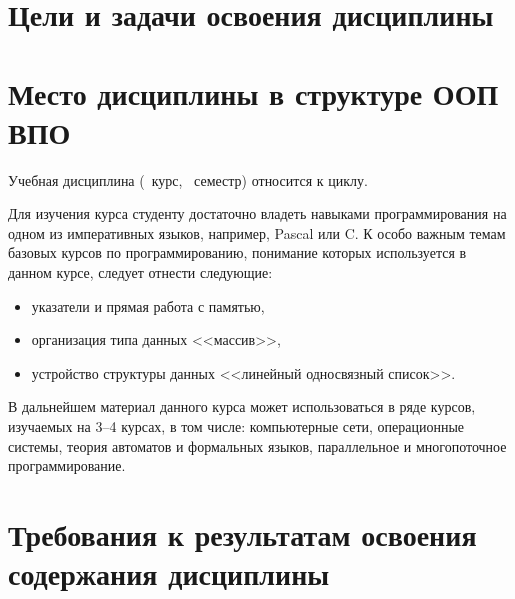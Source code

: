 






\section{Цели и задачи освоения дисциплины}


\section{Место дисциплины в структуре ООП ВПО}


	\ssect Учебная дисциплина \thecourse{}
(\theyearofstudy~курс, \theglobalterm~семестр) относится к  циклу.

	\ssect %
Для изучения курса \thecourse{}
студенту достаточно владеть навыками программирования на одном из императивных языков, например, Pascal или C. К особо важным темам базовых курсов по программированию, понимание которых используется в данном курсе, следует отнести следующие:
\begin{itemize}
	\item указатели и прямая работа с памятью,
	\item организация типа данных <<массив>>,
	\item устройство структуры данных <<линейный односвязный список>>.
\end{itemize}

	\ssect
В дальнейшем материал данного курса может использоваться в ряде курсов,
изучаемых на 3--4 курсах, в том числе: компьютерные сети, операционные системы, теория автоматов и формальных языков, параллельное и многопоточное
программирование.

\section{Требования к результатам освоения содержания дисциплины}

